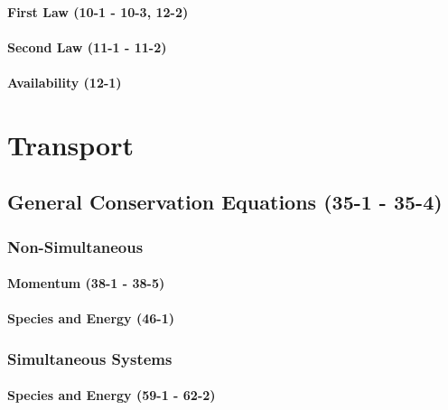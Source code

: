 \documentclass{mitqualif}
\begin{document}
\subsubsection{First Law (10-1 - 10-3, 12-2)}




\subsubsection{Second Law (11-1 - 11-2)}


\subsubsection{Availability (12-1)}

\newpage
\chapter{Transport}
\section{General Conservation Equations (35-1 - 35-4)}
\subsection{Non-Simultaneous}
\subsubsection{Momentum (38-1 - 38-5)}
\subsubsection{Species and Energy (46-1)}
\subsection{Simultaneous Systems}
\subsubsection{Species and Energy (59-1 - 62-2)}
\end{document}
